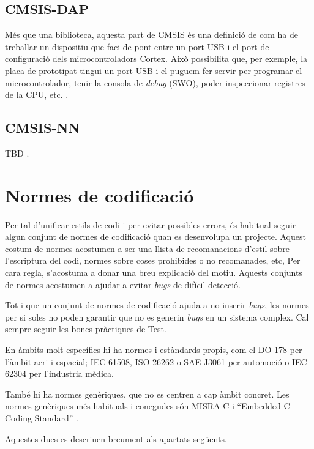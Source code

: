 \section{CMSIS-DAP}
\label{sec:CMSIS-DAP}
Més que una biblioteca, aquesta part de CMSIS és una definició de com ha de treballar un dispositiu que faci de pont entre un port USB i el port de configuració dels microcontroladors Cortex. Això possibilita que, per exemple, la placa de prototipat tingui un port USB i el puguem fer servir per programar el microcontrolador, tenir la consola de {\em debug} (SWO), poder inspeccionar registres de la CPU, etc. \cite{CMSIS-DAP}.

\section{CMSIS-NN}
\label{sec:CMSIS-NN}
TBD \cite{CMSIS-NN}.

\chapter{Normes de codificació}
\label{sec:GuiesProgramacio}

Per tal d'unificar estils de codi i per evitar possibles errors, és habitual seguir algun conjunt de normes de codificació quan es desenvolupa un projecte. Aquest costum de normes acostumen a ser una llista de recomanacions d'estil sobre l'escriptura del codi, normes sobre coses prohibides o no recomanades, etc, Per cara regla, s'acostuma a donar una breu explicació del motiu. Aquests conjunts de normes acostumen a ajudar a evitar {\em bugs} de difícil detecció.

\begin{remark}
Tot i que un conjunt de normes de codificació ajuda a no inserir {\em bugs}, les normes per si soles no poden garantir que no es generin {\em bugs} en un sistema complex. Cal sempre seguir les bones pràctiques de Test.%
\end{remark}

En àmbits molt específics hi ha normes i estàndards propis, com el DO-178 per l'àmbit aeri i espacial; IEC 61508, ISO 26262 o SAE J3061 per automoció o IEC 62304 per l'industria mèdica.

També hi ha normes genèriques, que no es centren a cap àmbit concret. Les normes genèriques més habituals i conegudes són MISRA-C \cite{MISRAHomepage} i ``Embedded C Coding Standard'' \cite{BARRGuidelines}.

Aquestes dues es descriuen breument als apartats següents.

